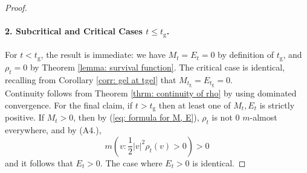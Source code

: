\documentclass[11pt, notitlepage]{article}
\begin{document}
\begin{proof}
\paragraph{2. Subcritical and Critical Cases $t\le t_\mathrm{g}$.} For $t<t_\mathrm{g}$, the result is immediate: we have $M_t=E_t=0$ by definition of $t_\mathrm{g}$, and $\rho_t=0$ by Theorem \ref{lemma: survival function}. The critical case is identical, recalling from Corollary \ref{corr: gel at tgel} that $M_{t_\mathrm{g}}=E_{t_\mathrm{g}}=0.$ \medskip \\ Continuity follows from Theorem \ref{thrm: continuity of rho} by using dominated convergence. For the final claim, if $t>t_\mathrm{g}$ then at least one of $M_t, E_t$ is strictly positive. If $M_t>0$, then by (\ref{eq: formula for M, E}), $\rho_t$ is not $0$ $m$-almost everywhere, and by (A4.), \begin{equation} m\left(v: \frac{1}{2}|v|^2\rho_t(v)>0\right)>0 \end{equation} and it follows that $E_t>0$. The case where $E_t>0$ is identical.   \end{proof}
\end{document}
